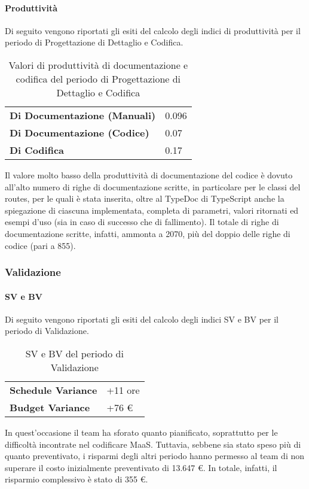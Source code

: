 \paragraph*{Produttività}
Di seguito vengono riportati gli esiti del calcolo degli indici di produttività per il periodo di Progettazione di Dettaglio e Codifica.
\begin{table}[H]
\centering
\begin{tabular}{|l|l|}
\cline{1-2}
\textbf{Di Documentazione (Manuali)} & 0.096 \\ \cline{1-2} %
\textbf{Di Documentazione (Codice)} & 0.07 \\ \cline{1-2} %
\textbf{Di Codifica} & 0.17 \\ \cline{1-2} %
\end{tabular}
\caption{Valori di produttività di documentazione e codifica del periodo di Progettazione di Dettaglio e Codifica}
\end{table}
Il valore molto basso della produttività di documentazione del codice è dovuto all'alto numero di righe di documentazione scritte, in particolare per le classi del  routes, per le quali è stata inserita, oltre al TypeDoc di TypeScript anche la spiegazione di ciascuna  implementata, completa di parametri, valori ritornati ed esempi d'uso (sia in caso di successo che di fallimento). Il totale di righe di documentazione scritte, infatti, ammonta a 2070, più del doppio delle righe di codice (pari a 855).

\subsubsection{Validazione}
\paragraph*{SV e BV}
Di seguito vengono riportati gli esiti del calcolo degli indici SV e BV per il periodo di Validazione.
\begin{table}[H]
\centering
\begin{tabular}{|l|l|}
\cline{1-2}
\textbf{Schedule Variance} & +11 ore \\ \cline{1-2}
\textbf{Budget Variance} & +76 \euro{} \\ \cline{1-2}
\end{tabular}
\caption{SV e BV del periodo di Validazione}
\end{table}
In quest'occasione il team ha sforato quanto pianificato, soprattutto per le difficoltà incontrate nel codificare MaaS. Tuttavia, sebbene sia stato speso più di quanto preventivato, i risparmi degli altri periodo hanno permesso al team di non superare il costo inizialmente preventivato di 13.647 \euro{}. In totale, infatti, il risparmio complessivo è stato di 355 \euro.
